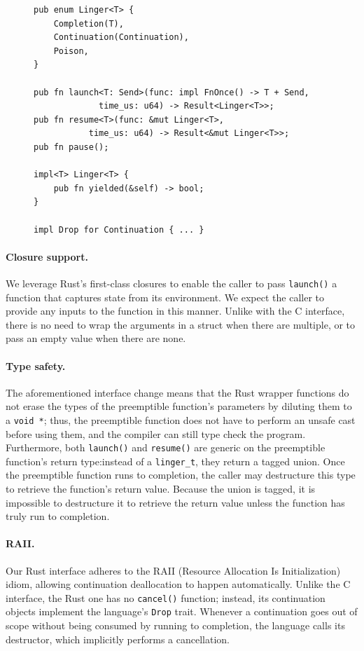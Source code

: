 \begin{figure}
\begin{lstlisting}[label=lst:ingerrustapi,caption=Preemptible functions Rust interface,morekeywords={fn,impl,mut,pub,self,u64,Drop,FnOnce,Result,Send}]
pub enum Linger<T> {
	Completion(T),
	Continuation(Continuation),
	Poison,
}

pub fn launch<T: Send>(func: impl FnOnce() -> T + Send,
			 time_us: u64) -> Result<Linger<T>>;
pub fn resume<T>(func: &mut Linger<T>,
		   time_us: u64) -> Result<&mut Linger<T>>;
pub fn pause();

impl<T> Linger<T> {
	pub fn yielded(&self) -> bool;
}

impl Drop for Continuation { ... }
\end{lstlisting}
\end{figure}


\paragraph{Closure support.}
We leverage Rust's first-class closures to enable the caller to pass
\texttt{launch()} a function that captures state from its environment.  We expect the
caller to provide any inputs to the function in this manner.  Unlike with the C
interface, there is no need to wrap the arguments in a struct when there are
multiple, or to pass an empty value when there are none.


\paragraph{Type safety.}
The aforementioned interface change means that the Rust wrapper functions do not
erase the types of the preemptible function's parameters by diluting them to a
\texttt{void *}; thus, the preemptible function does not have to perform an unsafe
cast before using them, and the compiler can still type check the program.
Furthermore, both \texttt{launch()} and \texttt{resume()} are generic on the
preemptible function's return type:\@ instead of a \texttt{linger\_t}, they return a
tagged union.  Once the preemptible function runs to completion, the caller may
destructure this type to retrieve the function's return value.  Because the union is
tagged, it is impossible to destructure it to retrieve the return value unless the
function has truly run to completion.


\paragraph{RAII.}
Our Rust interface adheres to the RAII (Resource Allocation Is Initialization) idiom,
allowing continuation deallocation to happen automatically.  Unlike the C interface,
the Rust one has no \texttt{cancel()} function; instead, its continuation objects
implement the language's \texttt{Drop} trait.  Whenever a continuation goes out of
scope without being consumed by running to completion, the language calls its
destructor, which implicitly performs a cancellation.


